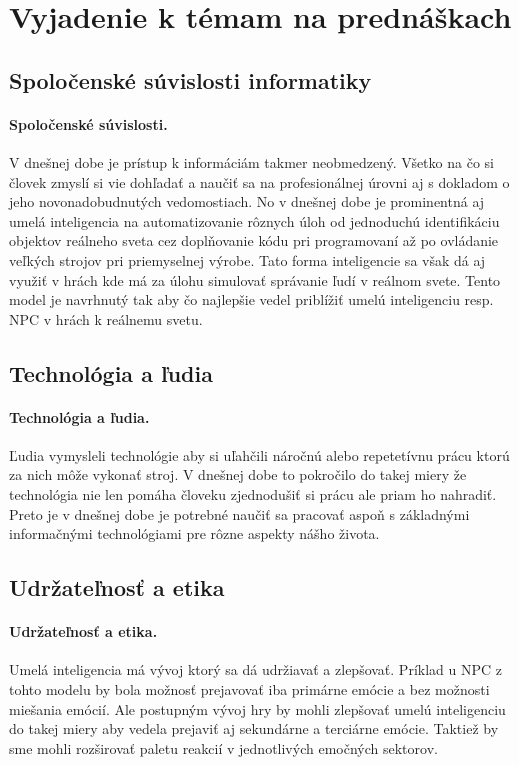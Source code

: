 \documentclass[10pt,twoside,slovak,a4paper]{article}
\begin{document}
\section{Vyjadenie k témam na prednáškach}

\subsection{Spoločenské súvislosti informatiky}

\paragraph{Spoločenské súvislosti.}  V dnešnej dobe je prístup k informáciám takmer neobmedzený.
Všetko na čo si človek zmyslí si vie dohľadať a naučiť sa na profesionálnej úrovni aj s dokladom
o jeho novonadobudnutých vedomostiach. No v dnešnej dobe je prominentná aj umelá inteligencia na
automatizovanie rôznych úloh od jednoduchú identifikáciu objektov reálneho sveta cez doplňovanie
kódu pri programovaní až po ovládanie veľkých strojov pri priemyselnej výrobe. Tato forma inteligencie
sa však dá aj využiť v hrách kde má za úlohu simulovať správanie ľudí v reálnom svete. Tento model je
navrhnutý tak aby čo najlepšie vedel priblížiť umelú inteligenciu resp. NPC v hrách k reálnemu svetu.

\subsection{Technológia a ľudia}

\paragraph{Technológia a ľudia.} Ľudia vymysleli technológie aby si uľahčili náročnú alebo repetetívnu
prácu ktorú za nich môže vykonať stroj. V dnešnej dobe to pokročilo do takej miery že technológia nie len
pomáha človeku zjednodušiť si prácu ale priam ho nahradiť. Preto je v dnešnej dobe je potrebné naučiť sa
pracovať aspoň s základnými informačnými technológiami pre rôzne aspekty nášho života.

\subsection{Udržateľnosť a etika}

\paragraph{Udržateľnosť a etika.} Umelá inteligencia má vývoj ktorý sa dá udržiavať a zlepšovať.
Príklad u NPC z tohto modelu by bola možnosť prejavovať iba primárne emócie a bez možnosti miešania
emócií. Ale postupným vývoj hry by mohli zlepšovať umelú inteligenciu do takej miery aby vedela prejaviť
aj sekundárne a terciárne emócie. Taktiež by sme mohli rozširovať paletu reakcií v jednotlivých emočných
sektorov.


 
\end{document}
